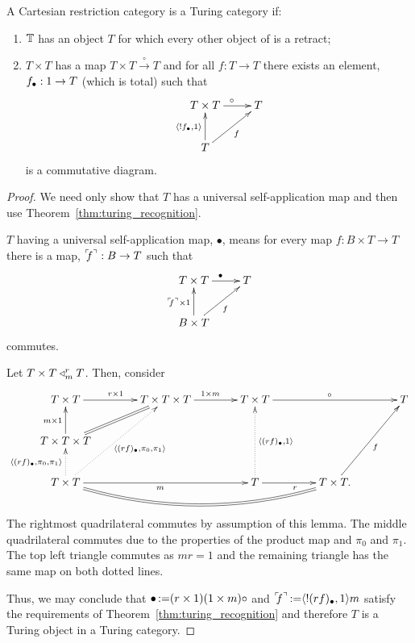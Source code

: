 \begin{lemma}\label{lem:t_t_to_t_gives_a_turing_category}
  A Cartesian restriction category \T is a Turing category if:
  \begin{enumerate}[{(}i{)}]
  \item $\mathbb{T}$ has an object $T$ for which every other object of \T is a retract;
  \item $T\times T$ has a map  $T\times T \xrightarrow{\ \circ\ }T$ and for all
    $f:T\to T$ there exists an element, $f_{\bullet}:1\to T$ (which is total) such that
      \[
        \xymatrix{
          T\times T \ar[r]^{\circ} & T \\
          T \ar[ur]_{f} \ar[u]^{\<!\code{f},1\>}
        }
      \]
    is a commutative diagram.
  \end{enumerate}
\end{lemma}
\begin{proof}
  We need only show that $T$ has a universal self-application map and then use
  Theorem~\ref{thm:turing_recognition}.

  $T$ having a universal self-application map, $\bullet$, means for every map $f:B\times T \to T$ there is a
  map, ${}^\ulcorner\!\!f^\urcorner:B\to T$ such that
  \[
    \xymatrix{
      T\times T \ar[r]^{\bullet} & T \\
      B\times T \ar[ur]_{f} \ar[u]^{\name{f}\times1}
    }
  \]
  commutes.

  Let $T\times T\triangleleft_{m}^{r} T$. Then, consider
  \[
    \xymatrix@C+15pt{
     T\times T \ar[r]^{r\times 1} & T\times T\times T \ar[r]^{1\times m} &T\times T \ar[rr]^{\circ}
       && T \\
     T\times T\times T \ar[u]^{m\times 1} \ar@{=}[ur]\\
     T\times T \ar@{.>}[u]^{\<\code{(r f)},\pi_0,\pi_1\>} \ar@{.>}[uur]_{\<\code{(r f)},\pi_0,\pi_1\>}
       \ar[rr]_{m} \ar@{=}@/_20pt/[rrr]
       & & T \ar[r]_{r} \ar@{.>}[uu]_{\<\code{(r f)},1\>} &T\times T. \ar[uur]_{f}
    }
  \]
  \\[10pt]
  The rightmost quadrilateral commutes by assumption of this lemma. The middle quadrilateral
  commutes due to the properties of the product map and $\pi_0$ and $\pi_1$. The top left triangle
  commutes as $m r = 1$ and the remaining triangle has the same map on both dotted lines.

  Thus, we may conclude that $\bullet \operatorname*{:\!=} (r \times 1)(1\times m) \circ$ and
  ${}^\ulcorner\!\!f^\urcorner\operatorname*{:\!=} \langle!(rf)_{\bullet},1\rangle m$ satisfy the requirements of
  Theorem~\ref{thm:turing_recognition} and therefore $T$ is a Turing object in a Turing category.
\end{proof}
